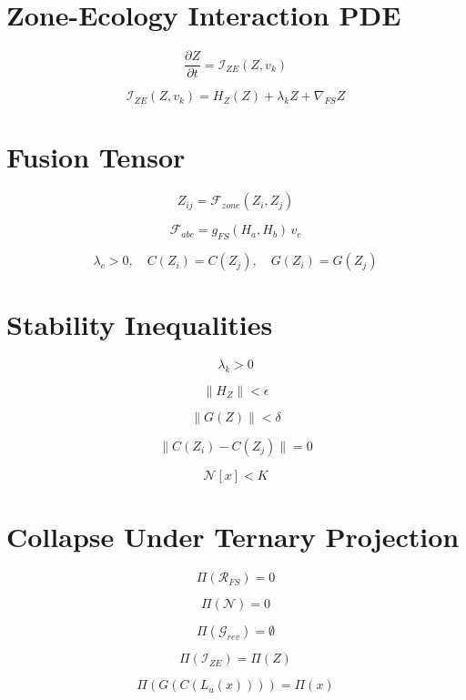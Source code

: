 
\section*{Zone-Ecology Interaction PDE}

\[
\frac{\partial Z}{\partial t}
= \mathcal{I}_{ZE}(Z, v_k)
\]

\[
\mathcal{I}_{ZE}(Z, v_k)
= H_Z(Z)
+ \lambda_k Z
+ \nabla_{FS} Z
\]


\section*{Fusion Tensor}

\[
Z_{ij}
= \mathcal{F}_{zone}(Z_i, Z_j)
\]

\[
\mathcal{F}_{abc}
= g_{FS}(H_a, H_b)\, v_c
\]

\[
\lambda_c > 0,\quad
C(Z_i) = C(Z_j),\quad
G(Z_i) = G(Z_j)
\]


\section*{Stability Inequalities}

\[
\lambda_k > 0
\]

\[
\|H_Z\| < \epsilon
\]

\[
\|G(Z)\| < \delta
\]

\[
\|C(Z_i) - C(Z_j)\| = 0
\]

\[
\mathcal{N}[x] < K
\]


\section*{Collapse Under Ternary Projection}

\[
\Pi(\mathcal{R}_{FS}) = 0
\]

\[
\Pi(\mathcal{N}) = 0
\]

\[
\Pi(\mathcal{G}_{rev}) = \emptyset
\]

\[
\Pi(\mathcal{I}_{ZE}) = \Pi(Z)
\]

\[
\Pi(G(C(L_u(x)))) = \Pi(x)
\]

